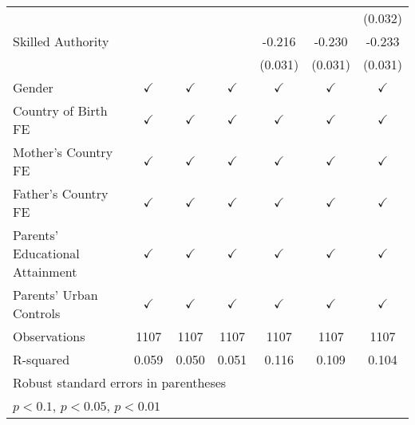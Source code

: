 \documentclass[]{article}
\begin{document}
\begin{table}
\begin{adjustbox}{width=\columnwidth,center}
{\begin{tabular}{l*{6}{c}}
                &                  &                  &                  &                  &                  &  (0.032)         \\
[1em]
Skilled Authority&                  &                  &                  &   -0.216\sym{***}&   -0.230\sym{***}&   -0.233\sym{***}\\
                &                  &                  &                  &  (0.031)         &  (0.031)         &  (0.031)         \\
\hline
Gender          &$\checkmark$         &$\checkmark$         &$\checkmark$         &$\checkmark$         &$\checkmark$         &$\checkmark$         \\
Country of Birth FE&$\checkmark$         &$\checkmark$         &$\checkmark$         &$\checkmark$         &$\checkmark$         &$\checkmark$         \\
Mother's Country FE&$\checkmark$         &$\checkmark$         &$\checkmark$         &$\checkmark$         &$\checkmark$         &$\checkmark$         \\
Father's Country FE&$\checkmark$         &$\checkmark$         &$\checkmark$         &$\checkmark$         &$\checkmark$         &$\checkmark$         \\
Parents' Educational Attainment&$\checkmark$         &$\checkmark$         &$\checkmark$         &$\checkmark$         &$\checkmark$         &$\checkmark$         \\
Parents' Urban Controls&$\checkmark$         &$\checkmark$         &$\checkmark$         &$\checkmark$         &$\checkmark$         &$\checkmark$         \\
Observations    & 1107   & 1107      & 1107    & 1107      & 1107& 1107  \\
R-squared       &    0.059         &    0.050         &    0.051         &    0.116         &    0.109         &    0.104         \\
\hline\hline
\multicolumn{7}{l}{\footnotesize Robust standard errors in parentheses}\\
\multicolumn{7}{l}{\footnotesize \sym{*} \(p<0.1\), \sym{**} \(p<0.05\), \sym{***} \(p<0.01\)}\\
\end{tabular}
}






\end{adjustbox}

\end{table}
\end{document}
